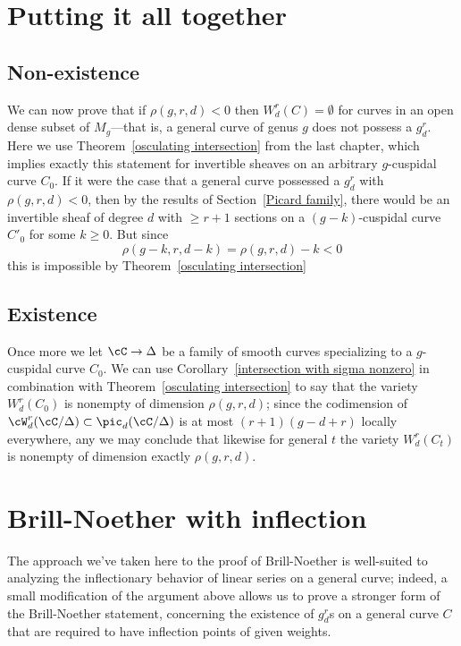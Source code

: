\section{Putting it all together}

\subsection{Non-existence}\label{nonexistence}

We can now prove that if $\rho(g,r,d) < 0$  then $W^{r}_{d}(C) = \emptyset$ for curves in an open dense subset of $M_{g}$---that is, a general curve of genus $g$ does not possess a $g^r_d$.
Here we use Theorem~\ref{osculating intersection} from the last chapter, which implies exactly this statement for invertible sheaves on an arbitrary $g$-cuspidal curve $C_0$. If it were the case that a general curve possessed a $g^r_d$ with $\rho(g,r,d) < 0$, then by the results of Section~\ref{Picard family}, there would be
 an invertible sheaf of degree $d$ with $\geq r+1$ sections on a $(g-k)$-cuspidal curve  $ C'_0$ for some $k \geq 0$. But since
$$
\rho(g-k, r, d-k) = \rho(g,r,d) - k < 0
$$
this is impossible by Theorem~\ref{osculating intersection}

\subsection{Existence}

Once more we let $\cC \to \Delta$ be a family of smooth curves specializing to a $g$-cuspidal curve $C_0$. We can use Corollary~\ref{intersection with sigma nonzero} in combination with Theorem~\ref{osculating intersection} to say that the variety $W^r_d(C_0)$ is nonempty of dimension $\rho(g,r,d)$; since the codimension of $\cW^r_d(\cC/\Delta) \subset \pic_d(\cC/\Delta)$ is at most $(r+1)(g-d+r)$ locally everywhere, any we may conclude that likewise for general $t$ the variety $W^r_d(C_t)$ is nonempty of dimension exactly $\rho(g,r,d)$. 

\section{Brill-Noether with inflection}

The approach we've taken here to the proof of Brill-Noether is well-suited to analyzing the inflectionary behavior of linear series on a general curve; indeed, a small modification of the argument above allows us to prove a stronger form of the Brill-Noether statement, concerning the existence of $g^r_d$s on a general curve $C$ that are required to
 have inflection points of given weights.


